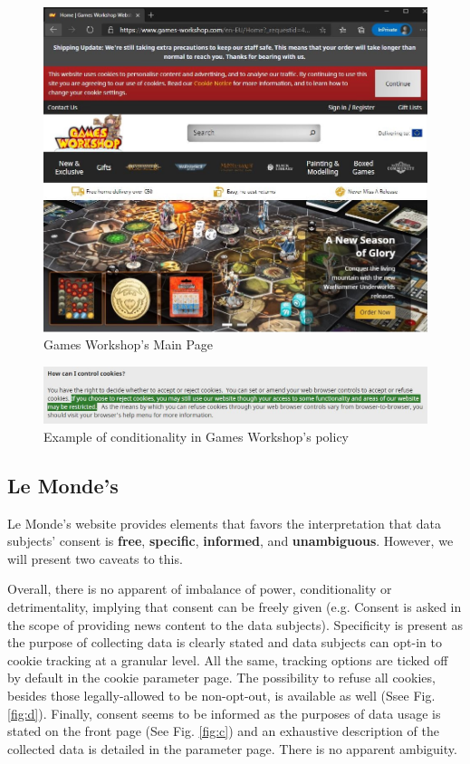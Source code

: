\documentclass[twocolumn, letterpaper]{scrartcl}
\begin{document}
 		\begin{figure}
    		\includegraphics[width=0.95\linewidth]{gw_website.JPG}
     		\caption{Games Workshop's Main Page \label{fig:a}}
     	\end{figure}
    
        \begin{figure}[tbp]	
            \includegraphics[width=0.95\linewidth]{conditionality.JPG}
            \caption{Example of conditionality in Games Workshop's policy \label{fig:b}}
        \end{figure}
        
	\subsection*{Le Monde's}

    	Le Monde's website provides elements that favors the interpretation that data subjects' consent is \textbf{free}, \textbf{specific}, \textbf{informed}, and \textbf{unambiguous}. However, we will present two caveats to this. 
        
    	Overall, there is no apparent of imbalance of power, conditionality or detrimentality, implying that consent can be freely given (e.g. Consent is asked in the scope of providing news content to the data subjects). Specificity is present as the purpose of collecting data is clearly stated and data subjects can opt-in to cookie tracking at a granular level. All the same, tracking options are ticked off by default in the cookie parameter page. The possibility to refuse all cookies, besides those legally-allowed to be non-opt-out, is available as well (Ssee Fig. \ref{fig:d}). Finally, consent seems to be informed as the purposes of data usage is stated on the front page (See Fig. \ref{fig:c}) and an exhaustive description of the collected data is detailed in the parameter page. There is no apparent ambiguity.
    	
\end{document}
